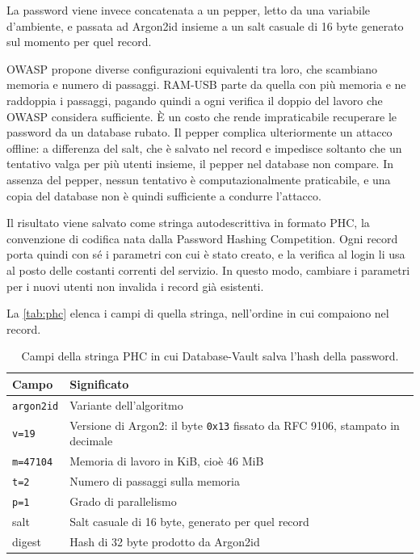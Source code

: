 La password viene invece concatenata a un pepper, letto da una variabile d'ambiente, e passata ad Argon2id 
\cite{rfc9106} insieme a un salt casuale di 16 byte generato sul momento per quel record.

OWASP \cite{owasp-password-storage} propone diverse configurazioni equivalenti tra loro, che
scambiano memoria e numero di passaggi. RAM-USB parte da quella con più memoria e ne raddoppia i
passaggi, pagando quindi a ogni verifica il doppio del lavoro che OWASP considera sufficiente. È un
costo che rende impraticabile recuperare le password da un database rubato. Il pepper complica
ulteriormente un attacco offline: a differenza del salt, che è salvato nel record e impedisce
soltanto che un tentativo valga per più utenti insieme, il pepper nel database non compare. In assenza del pepper, 
nessun tentativo è computazionalmente praticabile, e una copia del database non è quindi 
sufficiente a condurre l'attacco.

Il risultato viene salvato come stringa autodescrittiva in formato PHC, la convenzione di codifica
nata dalla Password Hashing Competition. Ogni record porta quindi con sé i parametri con cui è stato creato, 
e la verifica al login li usa al posto delle costanti correnti del servizio. 
In questo modo, cambiare i parametri per i nuovi utenti non invalida i record già esistenti. 

La \autoref{tab:phc} elenca i campi di quella stringa, nell'ordine in cui compaiono nel record.

\begin{table}[H]
\centering
\caption{Campi della stringa PHC in cui Database-Vault salva l'hash della password.}
\label{tab:phc}
\begin{tabular}{@{}l p{}@{}}
\hline
\textbf{Campo} & \textbf{Significato} \\
\hline
\texttt{argon2id} & Variante dell'algoritmo \\
\texttt{v=19} & Versione di Argon2: il byte \texttt{0x13} fissato da RFC 9106, stampato in decimale \\
\texttt{m=47104} & Memoria di lavoro in KiB, cioè 46 MiB \\
\texttt{t=2} & Numero di passaggi sulla memoria \\
\texttt{p=1} & Grado di parallelismo \\
salt & Salt casuale di 16 byte, generato per quel record \\
digest & Hash di 32 byte prodotto da Argon2id \\
\hline
\end{tabular}
\end{table}

